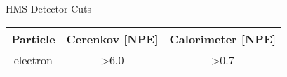 \begin{Mtable}{HMS Detector Cuts}
  \centering
  \begin{tabular}{|c|c|c|}
    \hline
    \textbf{Particle} & \textbf{Cerenkov [NPE]} & \textbf{Calorimeter [NPE]} \\
    \hline    
    electron & >6.0 &  >0.7 \\
    \hline
  \end{tabular}
  \caption{}
  \label{tab:3-3_hms_cuts}
\end{Mtable}

